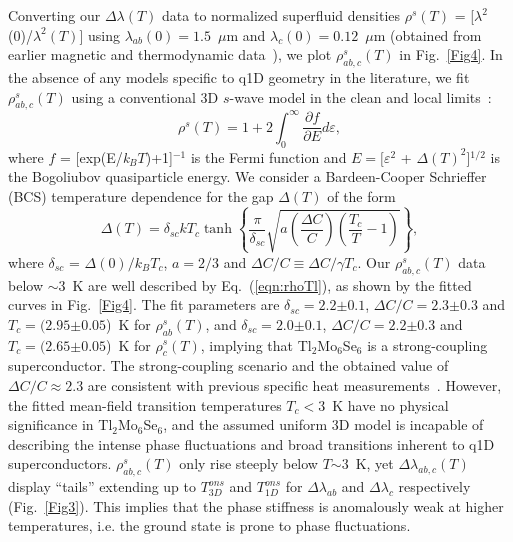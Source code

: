 \documentclass[prb,twocolumn,showpacs,preprintnumbers,amsmath,amssymb,floatfix,groupedaddress,superscriptaddress,aps,10pt]{revtex4-1}
\newcommand{\Tl}{Tl$_2$Mo$_6$Se$_6$}
\begin{document}
Converting our $\Delta\lambda(T)$ data to normalized superfluid densities $\rho^{s}(T)$ = [$\lambda^{2}$(0)/$\lambda^{2}(T)$] using $\lambda_{ab}(0)=1.5$~$\mu$m and $\lambda_{c}(0)=0.12$~$\mu$m (obtained from earlier magnetic and thermodynamic data~\cite{Petrovic2010}), we plot $\rho^s_{ab,c}(T)$ in Fig.~\ref{Fig4}.  In the absence of any models specific to q1D geometry in the literature, we fit $\rho^s_{ab,c}(T)$ using a conventional 3D $s$-wave model in the clean and local limits~\cite{Tinkham}:
\begin{equation} \label{eqn:rhoTl}
\rho^{s}(T) = 1 + 2\int^{\infty}_{0} \frac{\partial f}{\partial E}
d\varepsilon,
\end{equation}     
where $f$ = [exp(E/{\it k}$_{B}T$)+1]$^{-1}$ is the Fermi function and $E = [\varepsilon^{2}$ + $\Delta (T)^{2}$]$^{1/2}$ is the Bogoliubov quasiparticle energy. We consider a Bardeen-Cooper Schrieffer (BCS) temperature dependence for the gap $\Delta(T)$ of the form~\cite{Gross1986}
\begin{equation} \label{eqn:gapGross}
\Delta(\mathit{T})=\delta
_{sc}\mathit{kT}_{c}\tanh\left\{\frac{\pi}{\delta
	_{sc}}\sqrt{a\left(\frac{\Delta C}{C}\right)
	\left(\frac{T_{c}}{T}-1\right)}\right\},
\end{equation} 
where $\delta_{sc}$ = $\Delta(0)/k_{B}T_{c}$, $a = 2/3$ and $\Delta C/C \equiv \Delta C/\gamma T_{c}$.  Our $\rho^s_{ab,c}(T)$ data below $\sim$3~K are well described by Eq.~(\ref{eqn:rhoTl}), as shown by the fitted curves in Fig.~\ref{Fig4}. The fit parameters are $\delta_{sc}=2.2$$\pm$$0.1$, $\Delta C/C=2.3$$\pm$$0.3$ and $T_{c}=(2.95$$\pm$$0.05$)~K for $\rho^s_{ab}(T)$, and $\delta_{sc}=2.0$$\pm$$0.1$, $\Delta C/C=2.2$$\pm$$0.3$ and $T_{c}=(2.65$$\pm$$0.05$)~K for $\rho^s_{c}(T)$, implying that Tl$_2$Mo$_6$Se$_6$ is a strong-coupling superconductor. The strong-coupling scenario and the obtained value of $\Delta C/C\approx2.3$ are consistent with previous specific heat measurements~\cite{Petrovic2010}.  However, the fitted mean-field transition temperatures $T_c<3$~K have no physical significance in {\Tl}, and the assumed uniform 3D model is incapable of describing the intense phase fluctuations and broad transitions inherent to q1D superconductors. $\rho^s_{ab,c}(T)$ only rise steeply below $T$$\sim$3~K, yet $\Delta\lambda_{ab,c}(T)$ display ``tails'' extending up to $T_{3D}^{ons}$ and $T_{1D}^{ons}$ for $\Delta\lambda_{ab}$ and $\Delta\lambda_{c}$ respectively (Fig.~\ref{Fig3}).  This implies that the phase stiffness is anomalously weak at higher temperatures, i.e. the ground state is prone to phase fluctuations.
\end{document}
